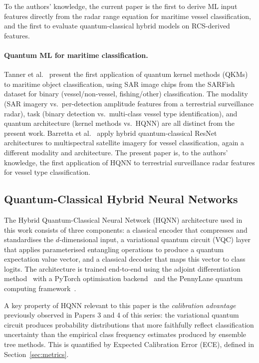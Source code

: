 \documentclass[journal]{IEEEtran}
\begin{document}
To the authors' knowledge, the current paper is the first to derive
ML input features directly from the radar range equation for maritime
vessel classification, and the first to evaluate quantum-classical
hybrid models on RCS-derived features.

\paragraph{Quantum ML for maritime classification.}
Tanner et al.~\cite{tanner2025qkm} present the first application of
quantum kernel methods (QKMs) to maritime object classification, using
SAR image chips from the SARFish dataset for binary
(vessel/non-vessel, fishing/other) classification. The modality (SAR
imagery vs.\ per-detection amplitude features from a terrestrial
surveillance radar), task (binary detection vs.\ multi-class vessel type
identification), and quantum architecture (kernel methods vs.\ HQNN)
are all distinct from the present work. Barretta et al.~\cite{barretta2025hqnn}
apply hybrid quantum-classical ResNet architectures to multispectral
satellite imagery for vessel classification, again a different modality
and architecture. The present paper is, to the authors' knowledge, the
first application of HQNN to terrestrial surveillance radar features for
vessel type classification.

\subsection{Quantum-Classical Hybrid Neural Networks}

The Hybrid Quantum-Classical Neural Network (HQNN) architecture
used in this work consists of three components: a classical encoder
that compresses and standardises the $d$-dimensional input, a
variational quantum circuit (VQC) layer that applies parameterised
entangling operations to produce a quantum expectation value vector,
and a classical decoder that maps this vector to class logits. The
architecture is trained end-to-end using the adjoint differentiation
method~\cite{jones2020adjoint} with a PyTorch optimisation
backend~\cite{pytorch2019} and the PennyLane quantum computing
framework~\cite{pennylane2018}.

A key property of HQNN relevant to this paper is the
\emph{calibration advantage} previously observed in Papers 3 and 4 of
this series: the variational quantum circuit produces probability
distributions that more faithfully reflect classification
uncertainty than the empirical class frequency estimates produced by
ensemble tree methods. This is quantified by Expected Calibration Error
(ECE), defined in Section~\ref{sec:metrics}.
\end{document}
